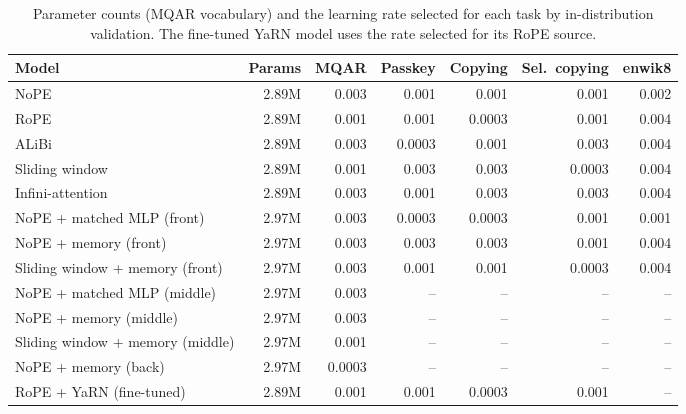 \begin{table}\centering\small
\setlength{\tabcolsep}{4pt}
\begin{tabular}{lrrrrrr}
\toprule
Model & Params & MQAR & Passkey & Copying & Sel.\ copying & enwik8 \\
\midrule
NoPE & 2.89M & 0.003 & 0.001 & 0.001 & 0.001 & 0.002 \\
RoPE & 2.89M & 0.001 & 0.001 & 0.0003 & 0.001 & 0.004 \\
ALiBi & 2.89M & 0.003 & 0.0003 & 0.001 & 0.003 & 0.004 \\
Sliding window & 2.89M & 0.001 & 0.003 & 0.003 & 0.0003 & 0.004 \\
Infini-attention & 2.89M & 0.003 & 0.001 & 0.003 & 0.003 & 0.004 \\
NoPE + matched MLP (front) & 2.97M & 0.003 & 0.0003 & 0.0003 & 0.001 & 0.001 \\
NoPE + memory (front) & 2.97M & 0.003 & 0.003 & 0.003 & 0.001 & 0.004 \\
Sliding window + memory (front) & 2.97M & 0.003 & 0.001 & 0.001 & 0.0003 & 0.004 \\
NoPE + matched MLP (middle) & 2.97M & 0.003 & -- & -- & -- & -- \\
NoPE + memory (middle) & 2.97M & 0.003 & -- & -- & -- & -- \\
Sliding window + memory (middle) & 2.97M & 0.001 & -- & -- & -- & -- \\
NoPE + memory (back) & 2.97M & 0.0003 & -- & -- & -- & -- \\
RoPE + YaRN (fine-tuned) & 2.89M & 0.001 & 0.001 & 0.0003 & 0.001 & -- \\
\bottomrule
\end{tabular}
\caption{Parameter counts (MQAR vocabulary) and the learning rate selected for each task by in-distribution validation. The fine-tuned YaRN model uses the rate selected for its RoPE source.}
\label{tab:lr}
\end{table}
